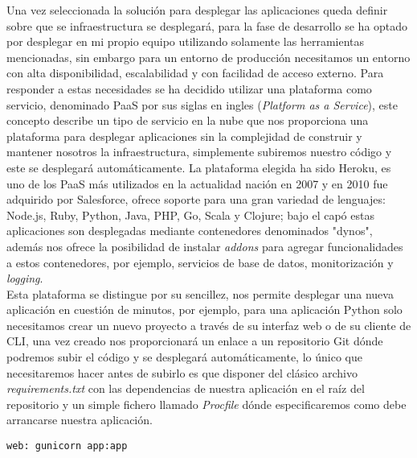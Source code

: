 \documentclass[../proyecto.tex]{subfiles}
\begin{document}
Una vez seleccionada la solución para desplegar las aplicaciones queda definir sobre que se infraestructura se desplegará, para la fase de desarrollo se ha optado por desplegar en mi propio equipo utilizando solamente las herramientas mencionadas, sin embargo para un entorno de producción necesitamos un entorno con alta disponibilidad, escalabilidad y con facilidad de acceso externo. Para responder a estas necesidades se ha decidido utilizar una plataforma como servicio, denominado PaaS por sus siglas en ingles (\textit{Platform as a Service}), este concepto describe un tipo de servicio en la nube que nos proporciona una plataforma para desplegar aplicaciones sin la complejidad de construir y mantener nosotros la infraestructura, simplemente subiremos nuestro código y este se desplegará automáticamente. La plataforma elegida ha sido Heroku, es uno de los PaaS más utilizados en la actualidad nación en 2007 y en 2010 fue adquirido por Salesforce, ofrece soporte para una gran variedad de lenguajes: Node.js, Ruby, Python, Java, PHP, Go, Scala y Clojure; bajo el capó estas aplicaciones son desplegadas mediante contenedores denominados "dynos", además nos ofrece la posibilidad de instalar \textit{addons} para agregar funcionalidades a estos contenedores, por ejemplo, servicios de base de datos, monitorización y \textit{logging}.\\

 Esta plataforma se distingue por su sencillez, nos permite desplegar una nueva aplicación en cuestión de minutos, por ejemplo, para una aplicación Python solo necesitamos crear un nuevo proyecto a través de su interfaz web o de su cliente de CLI, una vez creado nos proporcionará un enlace a un repositorio Git dónde podremos subir el código y se desplegará automáticamente, lo único que necesitaremos hacer antes de subirlo es que disponer del clásico archivo \textit{requirements.txt} con las dependencias de nuestra aplicación en el raíz del repositorio y un simple fichero llamado \textit{Procfile} dónde especificaremos como debe arrancarse nuestra aplicación.\\

 \begin{minipage}{\linewidth}
 \begin{lstlisting}[caption=Ejemplo de fichero Procfile para desplegar una aplicación Flask en Heroku , captionpos=b, frame=single]
 web: gunicorn app:app
 \end{lstlisting}
 \end{minipage}
\end{document}
